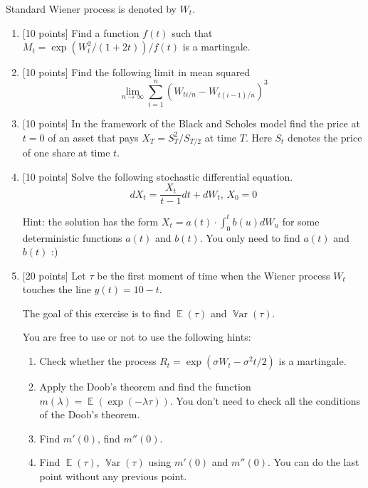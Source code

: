 \documentclass[12pt, a4paper]{article}
\DeclareMathOperator{\E}{\mathbb{E}}
\DeclareMathOperator{\Var}{\mathbb{V}ar}
\begin{document}
Standard Wiener process is denoted by $W_t$.

\begin{enumerate}
  \item {[10 points]} Find a function $f(t)$ such that $M_t = \exp(W_t^2 / (1+2t)) / f(t)$ is a martingale.
  \item {[10 points]} Find the following limit in mean squared
  \[
  \lim_{n\to \infty} \sum_{i=1}^n (W_{ti/n} - W_{t(i-1)/n})^3  
  \]
  
  \item {[10 points]} In the framework of the Black and Scholes model find the price at $t=0$ of an asset 
  that pays $X_T = S_T^2/S_{T/2}$ at time $T$. 
  Here $S_t$ denotes the price of one share at time $t$.

  \item {[10 points]} Solve the following stochastic differential equation.
  \[
  dX_t = \frac{X_t}{t-1} dt +  dW_t, \, X_0 = 0
  \] 
  
  Hint: the solution has the form $X_t = a(t) \cdot \int_0^t b(u) dW_u$ for some deterministic functions $a(t)$ and $b(t)$.
You only need to find $a(t)$ and $b(t)$ :)

  \item {[20 points]} Let $\tau$ be the first moment of time 
  when the Wiener process $W_t$ touches the line $y(t) = 10 - t$. 
  
The goal of this exercise is to find $\E(\tau)$ and $\Var(\tau)$. 

You are free to use or not to use the following hints:

  \begin{enumerate}
    \item Check whether the process $R_t = \exp(\sigma W_t - \sigma^2 t/2)$ is a martingale. 
    \item Apply the Doob's theorem and find the function $m(\lambda) = \E(\exp(-\lambda \tau))$. 
    You don't need to check all the conditions of the Doob's theorem. 
    \item Find $m'(0)$, find $m''(0)$.
    \item Find $\E(\tau)$, $\Var(\tau)$ using $m'(0)$ and $m''(0)$. You can do the last point without any previous point. 
  \end{enumerate}




\end{enumerate}
\end{document}

